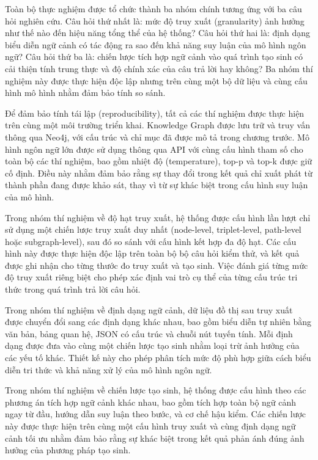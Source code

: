 Toàn bộ thực nghiệm được tổ chức thành ba nhóm chính tương ứng với ba câu hỏi nghiên cứu. Câu hỏi thứ nhất là: mức độ truy xuất (granularity) ảnh hưởng như thế nào đến hiệu năng tổng thể của hệ thống? Câu hỏi thứ hai là: định dạng biểu diễn ngữ cảnh có tác động ra sao đến khả năng suy luận của mô hình ngôn ngữ? Câu hỏi thứ ba là: chiến lược tích hợp ngữ cảnh vào quá trình tạo sinh có cải thiện tính trung thực và độ chính xác của câu trả lời hay không? Ba nhóm thí nghiệm này được thực hiện độc lập nhưng trên cùng một bộ dữ liệu và cùng cấu hình mô hình nhằm đảm bảo tính so sánh.

Để đảm bảo tính tái lập (reproducibility), tất cả các thí nghiệm được thực hiện trên cùng một môi trường triển khai. Knowledge Graph được lưu trữ và truy vấn thông qua Neo4j, với cấu trúc và chỉ mục đã được mô tả trong chương trước. Mô hình ngôn ngữ lớn được sử dụng thông qua API với cùng cấu hình tham số cho toàn bộ các thí nghiệm, bao gồm nhiệt độ (temperature), top-p và top-k được giữ cố định. Điều này nhằm đảm bảo rằng sự thay đổi trong kết quả chỉ xuất phát từ thành phần đang được khảo sát, thay vì từ sự khác biệt trong cấu hình suy luận của mô hình.

Trong nhóm thí nghiệm về độ hạt truy xuất, hệ thống được cấu hình lần lượt chỉ sử dụng một chiến lược truy xuất duy nhất (node-level, triplet-level, path-level hoặc subgraph-level), sau đó so sánh với cấu hình kết hợp đa độ hạt. Các cấu hình này được thực hiện độc lập trên toàn bộ bộ câu hỏi kiểm thử, và kết quả được ghi nhận cho từng thước đo truy xuất và tạo sinh. Việc đánh giá từng mức độ truy xuất riêng biệt cho phép xác định vai trò cụ thể của từng cấu trúc tri thức trong quá trình trả lời câu hỏi.

Trong nhóm thí nghiệm về định dạng ngữ cảnh, dữ liệu đồ thị sau truy xuất được chuyển đổi sang các định dạng khác nhau, bao gồm biểu diễn tự nhiên bằng văn bản, bảng quan hệ, JSON có cấu trúc và chuỗi nút tuyến tính. Mỗi định dạng được đưa vào cùng một chiến lược tạo sinh nhằm loại trừ ảnh hưởng của các yếu tố khác. Thiết kế này cho phép phân tích mức độ phù hợp giữa cách biểu diễn tri thức và khả năng xử lý của mô hình ngôn ngữ.

Trong nhóm thí nghiệm về chiến lược tạo sinh, hệ thống được cấu hình theo các phương án tích hợp ngữ cảnh khác nhau, bao gồm tích hợp toàn bộ ngữ cảnh ngay từ đầu, hướng dẫn suy luận theo bước, và cơ chế hậu kiểm. Các chiến lược này được thực hiện trên cùng một cấu hình truy xuất và cùng định dạng ngữ cảnh tối ưu nhằm đảm bảo rằng sự khác biệt trong kết quả phản ánh đúng ảnh hưởng của phương pháp tạo sinh.

